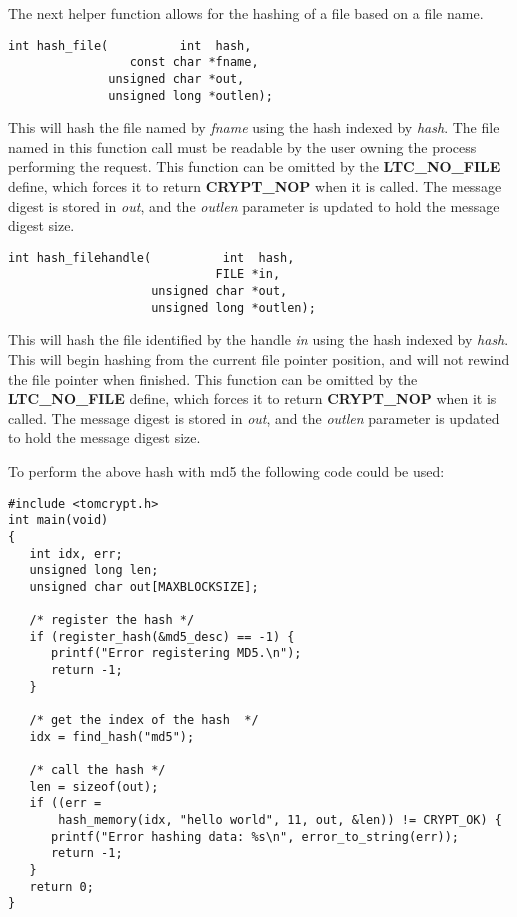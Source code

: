 \documentclass[synpaper]{book}
\begin{document}
The next helper function allows for the hashing of a file based on a file name.
\begin{verbatim}
int hash_file(          int  hash,
                 const char *fname,
              unsigned char *out,
              unsigned long *outlen);
\end{verbatim}

This will hash the file named by \textit{fname} using the hash indexed by \textit{hash}.  The file named in this function call must be readable by the
user owning the process performing the request.  This function can be omitted by the \textbf{LTC\_NO\_FILE} define, which forces it to return \textbf{CRYPT\_NOP}
when it is called.  The message digest is stored in \textit{out}, and the \textit{outlen} parameter is updated to hold the message digest size.

\begin{verbatim}
int hash_filehandle(          int  hash,
                             FILE *in,
                    unsigned char *out,
                    unsigned long *outlen);
\end{verbatim}

This will hash the file identified by the handle \textit{in} using the hash indexed by \textit{hash}.  This will begin hashing from the current file pointer position, and
will not rewind the file pointer when finished.  This function can be omitted by the \textbf{LTC\_NO\_FILE} define, which forces it to return \textbf{CRYPT\_NOP}
when it is called.  The message digest is stored in \textit{out}, and the \textit{outlen} parameter is updated to hold the message digest size.

To perform the above hash with md5 the following code could be used:
\begin{small}
\begin{verbatim}
#include <tomcrypt.h>
int main(void)
{
   int idx, err;
   unsigned long len;
   unsigned char out[MAXBLOCKSIZE];

   /* register the hash */
   if (register_hash(&md5_desc) == -1) {
      printf("Error registering MD5.\n");
      return -1;
   }

   /* get the index of the hash  */
   idx = find_hash("md5");

   /* call the hash */
   len = sizeof(out);
   if ((err =
       hash_memory(idx, "hello world", 11, out, &len)) != CRYPT_OK) {
      printf("Error hashing data: %s\n", error_to_string(err));
      return -1;
   }
   return 0;
}
\end{verbatim}
\end{small}
\end{document}
